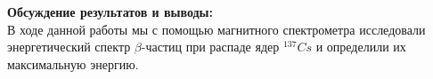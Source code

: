 \documentclass[a4paper, 12pt]{article}%
\begin{document}
\begin{enumerate}
		\textbf{Обсуждение результатов и выводы: }\\  
		
		В ходе данной работы мы с помощью магнитного спектрометра исследовали энергетический спектр $\beta$-частиц при распаде ядер ${}^137Cs$ и определили их максимальную энергию.
		
		
		
		
		
		
		
		
		
		
		
		
		
		
		
		
		
	\end{enumerate}
	
	
	
	
	
	
	
	
	
	
	
	
	
	
	
	
	
	
	
	
	
	
	
	
	
	
	
	
	
	
	
	
	
	
	
	
	
	
\end{document}
